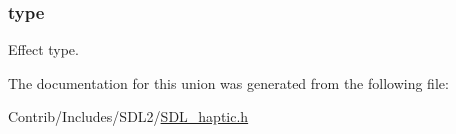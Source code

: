 \subsubsection[{\texorpdfstring{type}{type}}]{ type}\hypertarget{union_s_d_l___haptic_effect_a8db4a3e9f29940892f2773bca31c74e1}{}\label{union_s_d_l___haptic_effect_a8db4a3e9f29940892f2773bca31c74e1}
Effect type. 

The documentation for this union was generated from the following file\+:\begin{DoxyCompactItemize}
\item 
Contrib/\+Includes/\+S\+D\+L2/\hyperlink{_s_d_l__haptic_8h}{S\+D\+L\+\_\+haptic.\+h}\end{DoxyCompactItemize}
